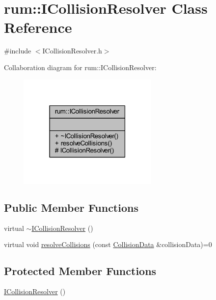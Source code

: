 \hypertarget{classrum_1_1_i_collision_resolver}{}\section{rum\+:\+:I\+Collision\+Resolver Class Reference}
\label{classrum_1_1_i_collision_resolver}


{\ttfamily \#include $<$I\+Collision\+Resolver.\+h$>$}



Collaboration diagram for rum\+:\+:I\+Collision\+Resolver\+:\nopagebreak
\begin{figure}[H]
\begin{center}
\leavevmode
\includegraphics[width=195pt]{classrum_1_1_i_collision_resolver__coll__graph}
\end{center}
\end{figure}
\subsection*{Public Member Functions}
\begin{DoxyCompactItemize}
\item 
virtual \mbox{\hyperlink{classrum_1_1_i_collision_resolver_a32710d1c72bd286f1fbf8d38e96f3ff5}{$\sim$\+I\+Collision\+Resolver}} ()
\item 
virtual void \mbox{\hyperlink{classrum_1_1_i_collision_resolver_aa144ceb4707987f0b554b256232eac5b}{resolve\+Collisions}} (const \mbox{\hyperlink{classrum_1_1_collision_data}{Collision\+Data}} \&collision\+Data)=0
\end{DoxyCompactItemize}
\subsection*{Protected Member Functions}
\begin{DoxyCompactItemize}
\item 
\mbox{\hyperlink{classrum_1_1_i_collision_resolver_aa049ec6ea190fde8f8871c2fc61e4354}{I\+Collision\+Resolver}} ()
\end{DoxyCompactItemize}



